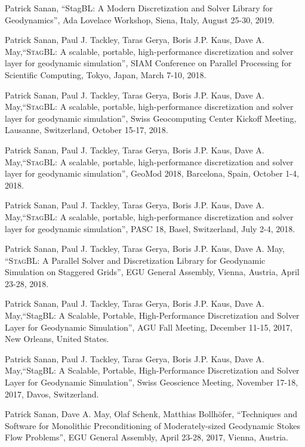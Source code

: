 \documentclass[a4paper,11pt]{article}
\renewcommand{\section}[1]{\pagebreak[3]%
    \vspace{1.3\baselineskip}%
    \phantomsection\addcontentsline{toc}{section}{#1}%
    \noindent\llap{\scshape\smash{\parbox[t]{\marginparwidth}{\hyphenpenalty=10000\raggedright #1}}}%
    \vspace{-\baselineskip}\par}
\begin{document}
\section{Posters}
\begin{innerlist}
  \item Patrick Sanan, ``StagBL: A Modern Discretization and Solver Library for Geodynamics'', Ada Lovelace Workshop, Siena, Italy, August 25-30, 2019.
  \item Patrick Sanan, Paul J. Tackley, Taras Gerya, Boris J.P. Kaus, Dave A. May,``\textsc{StagBL}: A scalable, portable, high-performance discretization and solver layer for geodynamic simulation'', SIAM Conference on Parallel Processing for Scientific Computing, Tokyo, Japan, March 7-10, 2018.
  \item Patrick Sanan, Paul J. Tackley, Taras Gerya, Boris J.P. Kaus, Dave A. May,``\textsc{StagBL}: A scalable, portable, high-performance discretization and solver layer for geodynamic simulation'', Swiss Geocomputing Center Kickoff Meeting, Lausanne, Switzerland, October 15-17, 2018.
  \item Patrick Sanan, Paul J. Tackley, Taras Gerya, Boris J.P. Kaus, Dave A. May,``\textsc{StagBL}: A scalable, portable, high-performance discretization and solver layer for geodynamic simulation'', GeoMod 2018, Barcelona, Spain, October 1-4, 2018.
  \item Patrick Sanan, Paul J. Tackley, Taras Gerya, Boris J.P. Kaus, Dave A. May,``\textsc{StagBL}: A scalable, portable, high-performance discretization and solver layer for geodynamic simulation'', PASC 18, Basel, Switzerland, July 2-4, 2018.
  \item Patrick Sanan, Paul J. Tackley, Taras Gerya, Boris J.P. Kaus, Dave A. May, ``\textsc{StagBL}: A Parallel Solver and Discretization Library for Geodynamic Simulation on Staggered Grids'', EGU General Assembly, Vienna, Austria, April 23-28, 2018.
\item Patrick Sanan, Paul J. Tackley, Taras Gerya, Boris J.P. Kaus, Dave A. May,``StagBL: A Scalable, Portable, High-Performance Discretization and Solver Layer for Geodynamic Simulation'', AGU Fall Meeting, December 11-15, 2017, New Orleans, United States.
\item Patrick Sanan, Paul J. Tackley, Taras Gerya, Boris J.P. Kaus, Dave A. May,``StagBL: A Scalable, Portable, High-Performance Discretization and Solver Layer for Geodynamic Simulation'', Swiss Geoscience Meeting, November 17-18, 2017, Davos, Switzerland.
\item Patrick Sanan, Dave A. May, Olaf Schenk, Matthias Bollh\"{o}fer, ``Techniques and Software for Monolithic Preconditioning of Moderately-sized Geodynamic Stokes Flow Problems'', EGU General Assembly, April 23-28, 2017, Vienna, Austria.

\end{innerlist}
\end{document}
